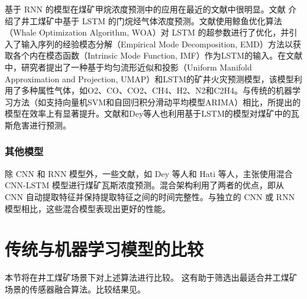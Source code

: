 \documentclass[lang=cn,a4paper,citestyle=gb7714-2015, bibstyle=gb7714-2015]{elegantpaper}
\newcommand{\mycite}[1]{\textsuperscript{\parencite{#1}}}
\begin{document}
    \bigskip
    基于 RNN 的模型在煤矿甲烷浓度预测中的应用在最近的文献中很明显。文献\mycite{Xu2022} 介绍了井工煤矿中基于 LSTM 的门烷烃气体浓度预测。文献使用鲸鱼优化算法（Whale Optimization Algorithm, WOA）对 LSTM 的超参数进行了优化，并引入了输入序列的经验模态分解（Empirical Mode Decomposition, EMD）方法以获取各个内在模态函数（Intrinsic Mode Function, IMF）作为LSTM的输入。在文献\mycite{Kumari2021}中，研究者提出了一种基于均匀流形近似和投影（Uniform Manifold Approximation and Projection, UMAP）和LSTM的矿井火灾预测模型，该模型利用了多种属性气体，如O2、CO、CO2、CH4、H2、N2和C2H4。与传统的机器学习方法（如支持向量机SVM和自回归积分滑动平均模型ARIMA）相比，所提出的模型在效率上有显著提升。文献\mycite{Meng2022}和Dey等人\mycite{Dey2021b}也利用基于LSTM的模型对煤矿中的瓦斯危害进行预测。

    \subsubsection{其他模型}
    除 CNN 和 RNN 模型外，一些文献，如 Dey 等人\mycite{Dey2021a}和 Hati 等人\mycite{Hati2022}，主张使用混合 CNN-LSTM 模型进行煤矿瓦斯浓度预测。混合架构利用了两者的优点，即从 CNN 自动提取特征并保持提取特征之间的时间完整性。与独立的 CNN 或 RNN 模型相比，这些混合模型表现出更好的性能。

    \section{传统与机器学习模型的比较}
    本节将在井工煤矿场景下对上述算法进行比较。 这有助于筛选出最适合井工煤矿场景的传感器融合算法。比较结果见。
\end{document}
